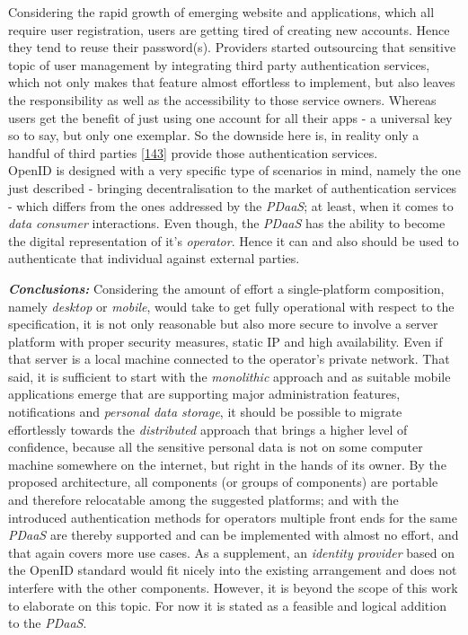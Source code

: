 \documentclass[12pt,english,a4paper,titlepage,cleardoublepage=empty,dottedtoc]{report}
\begin{document}
Considering the rapid growth of emerging website and applications, which
all require user registration, users are getting tired of creating new
accounts. Hence they tend to reuse their password(s). Providers started
outsourcing that sensitive topic of user management by integrating third
party authentication services, which not only makes that feature almost
effortless to implement, but also leaves the responsibility as well as
the accessibility to those service owners. Whereas users get the benefit
of just using one account for all their apps - a universal key so to
say, but only one exemplar. So the downside here is, in reality only a
handful of third parties
{[}\protect\hyperlink{ref-web_2009-success-of-facebook-connect}{143}{]}
provide those authentication services.\\
OpenID is designed with a very specific type of scenarios in mind,
namely the one just described - bringing decentralisation to the market
of authentication services - which differs from the ones addressed by
the \emph{PDaaS}; at least, when it comes to \emph{data consumer}
interactions. Even though, the \emph{PDaaS} has the ability to become
the digital representation of it's \emph{operator}. Hence it can and
also should be used to authenticate that individual against external
parties.

\emph{\textbf{Conclusions:}} Considering the amount of effort a
single-platform composition, namely \emph{desktop} or \emph{mobile},
would take to get fully operational with respect to the specification,
it is not only reasonable but also more secure to involve a server
platform with proper security measures, static IP and high availability.
Even if that server is a local machine connected to the operator's
private network. That said, it is sufficient to start with the
\emph{monolithic} approach and as suitable mobile applications emerge
that are supporting major administration features, notifications and
\emph{personal data storage}, it should be possible to migrate
effortlessly towards the \emph{distributed} approach that brings a
higher level of confidence, because all the sensitive personal data is
not on some computer machine somewhere on the internet, but right in the
hands of its owner. By the proposed architecture, all components (or
groups of components) are portable and therefore relocatable among the
suggested platforms; and with the introduced authentication methods for
operators multiple front ends for the same \emph{PDaaS} are thereby
supported and can be implemented with almost no effort, and that again
covers more use cases. As a supplement, an \emph{identity provider}
based on the OpenID standard would fit nicely into the existing
arrangement and does not interfere with the other components. However,
it is beyond the scope of this work to elaborate on this topic. For now
it is stated as a feasible and logical addition to the \emph{PDaaS}.
\end{document}
